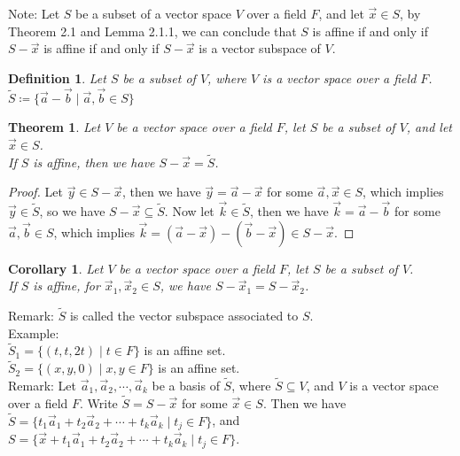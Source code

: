 \documentclass[11pt,oneside]{book}
\theoremstyle{break}
\theoremstyle{break}
\newtheorem{thm}{Theorem}[section]
\newtheorem{corT}[lem]{Corollary}
\newtheorem{defn}{Definition}[corL]
\newcommand{\note}{\color{red}Note: \color{black}}
\newcommand{\remark}{\color{blue}Remark: \color{black}}
\newcommand{\example}{\color{green}Example: \color{black}}
\begin{document}
\note Let $S$ be a subset of a vector space $V$ over a field $F$, and let $\vec{x}\in S$, by Theorem 2.1 and Lemma 2.1.1, we can conclude that $S$ is affine if and only if $S-\vec{x}$ is affine if and only if $S-\vec{x}$ is a vector subspace of $V$.

\begin{defn}
Let $S$ be a subset of $V$, where $V$ is a vector space over a field $F$. $\widetilde{S} \coloneqq \{\vec{a}-\vec{b} \mid \vec{a},\vec{b}\in S\}$
\end{defn}

\begin{thm}
Let $V$ be a vector space over a field $F$, let $S$ be a subset of $V$, and let $\vec{x}\in S$.\\ If $S$ is affine, then we have $S - \vec{x} = \widetilde{S}$.
\end{thm}
\begin{proof}
Let $\vec{y}\in S-\vec{x}$, then we have $\vec{y} = \vec{a} - \vec{x}$ for some $\vec{a}, \vec{x}\in S$, which implies $\vec{y} \in \widetilde{S}$, so we have $S-\vec{x} \subseteq \widetilde{S}$. Now let $\vec{k} \in \widetilde{S}$, then we have $\vec{k} = \vec{a}-\vec{b}$ for some $\vec{a},\vec{b}\in S$, which implies $\vec{k} = (\vec{a}-\vec{x})-(\vec{b}-\vec{x})\in S-\vec{x}$.
\end{proof}

\begin{corT}
Let $V$ be a vector space over a field $F$, let $S$ be a subset of $V$.\\ If $S$ is affine, for $\vec{x}_1,\vec{x}_2 \in S$, we have $S-\vec{x}_1 = S-\vec{x}_2$.
\end{corT}

\remark $\widetilde{S}$ is called the vector subspace associated to $S$.\\

\example\\
$\widetilde{S}_1 = \{(t,t,2t)\mid t\in F\}$ is an affine set.\\
$\widetilde{S}_2 = \{(x,y,0)\mid x,y \in F\}$ is an affine set.\\


\remark Let $\vec{a}_1,\vec{a}_2,\cdots, \vec{a}_k$ be a basis of $\widetilde{S}$, where $\widetilde{S}\subseteq V$, and $V$ is a vector space over a field $F$. Write $\widetilde{S} = S - \vec{x}$ for some $\vec{x}\in S$. Then we have $\widetilde{S} = \{ t_1 \vec{a}_1+t_2\vec{a}_2+\cdots+t_k\vec{a}_k\mid t_j \in F\}$, and $S = \{ \vec{x} + t_1 \vec{a}_1+t_2\vec{a}_2+\cdots+t_k\vec{a}_k\mid t_j \in F\}$.\\
\end{document}
